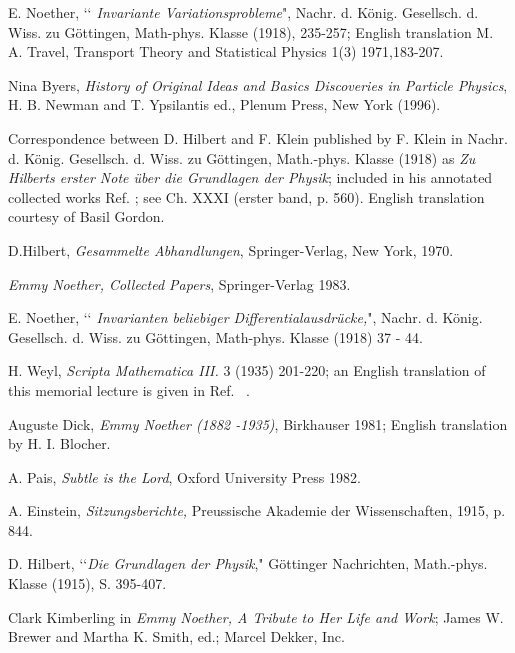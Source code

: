 \documentclass[12pt]{article}
\begin{document}
\newpage
\begin{thebibliography}{99}
 E. Noether, 
\lq\lq{\it{ Invariante Variationsprobleme}}", Nachr. d. K\"{o}nig. Gesellsch. d.
Wiss. zu G\"{o}ttingen, Math-phys. Klasse (1918), 235-257; English translation
M. A. Travel, Transport Theory and Statistical Physics 1(3) 1971,183-207.

 Nina Byers, {\it{History of Original Ideas and Basics Discoveries
in Particle Physics}}, H. B. Newman and T. Ypsilantis ed., Plenum Press, New York (1996).

 Correspondence between D. Hilbert and F. Klein published by
F. Klein in 
Nachr.  d. K\"{o}nig. Gesellsch. d.
Wiss. zu G\"{o}ttingen, Math.-phys. Klasse (1918) as 
{\it{Zu Hilberts erster Note \"uber die Grundlagen der Physik}};  included
  in his annotated collected works Ref. \cite{felix}; see
Ch. XXXI (erster band, p. 560).  English translation courtesy of Basil Gordon.

 D.Hilbert, {\it{Gesammelte Abhandlungen}}, Springer-Verlag, New
York, 1970.
 
 {\it{Emmy Noether, Collected Papers}}, Springer-Verlag 1983.


 E. Noether, \lq\lq{\it{ Invarianten beliebiger
Differentialausdr{\"{u}}cke,}}", Nachr. d. K\"{o}nig. Gesellsch. d.
Wiss. zu G\"{o}ttingen, Math-phys. Klasse (1918) 37 - 44.

 H. Weyl,
 {\it{Scripta Mathematica III.}} 3 (1935) 201-220; an English translation of
this memorial lecture is given 
 in Ref. ~\cite{Dick}.

 Auguste Dick,{\it{ Emmy Noether (1882 -1935)}},  Birkhauser 1981; English translation by  H. I. Blocher.


 A. Pais, {\it{Subtle is the Lord}}, Oxford University Press 
1982.


 A. Einstein, {\it{Sitzungsberichte,}} Preussische Akademie
der Wissenschaften, 1915, p. 844.


 D. Hilbert, \lq\lq{\it{Die Grundlagen der Physik}}," 
G\"ottinger Nachrichten, Math.-phys. Klasse (1915), S. 395-407.



 Clark Kimberling in {\it{Emmy Noether, A Tribute to Her Life 
and Work}}; James W. Brewer and Martha K. Smith, ed.; Marcel Dekker, Inc.




\end{thebibliography}
\end{document}
